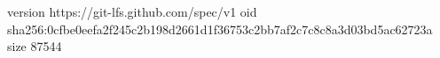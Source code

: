 version https://git-lfs.github.com/spec/v1
oid sha256:0cfbe0eefa2f245c2b198d2661d1f36753c2bb7af2c7c8c8a3d03bd5ac62723a
size 87544
